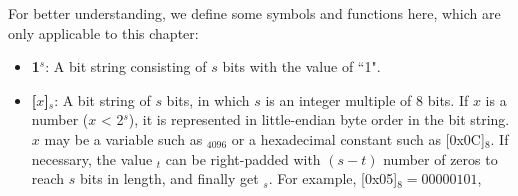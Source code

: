 \documentclass[main\_\_EN.tex]{subfiles}
\begin{document}
For better understanding, we define some symbols and functions here, which are only applicable to this chapter:

\begin{itemize}

    \item {\bfseries 1\begin{math}^s\end{math}}:
    A bit string consisting of \begin{math}s\end{math} bits with the value of ``1".

    \item {\bfseries [\begin{math}x\end{math}]\begin{math}_{s}\end{math}}:
       A bit string of \begin{math}s\end{math} bits, in which \begin{math}s\end{math} is an integer multiple of 8 bits. If \begin{math}x\end{math} is a number (\begin{math}x\end{math} < 2\begin{math}^s\end{math}), it is represented in little-endian byte order in the bit string. \begin{math}x\end{math} may be a variable such as \begin{math}[Y]_{4096}\end{math} or a hexadecimal constant such as [0x0C]\begin{math}_{8}\end{math}. If necessary, the value \begin{math}[x]_{t}\end{math} can be right-padded with \begin{math} (s-t) \end{math} number of zeros to reach \begin{math}s\end{math} bits in length, and finally get \begin{math}[x]_{s}\end{math}. For example, [0x05]\begin{math}_{8} = 00000101\end{math},

\end{itemize}
\end{document}
